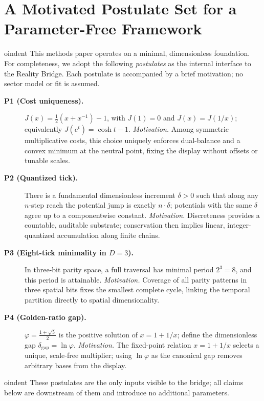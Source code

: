 \documentclass[11pt]{article}
\theoremstyle{plain}
\theoremstyle{definition}
\theoremstyle{remark}
\begin{document}
\section{A Motivated Postulate Set for a Parameter-Free Framework}

oindent
This methods paper operates on a minimal, dimensionless foundation. For completeness, we adopt the following \emph{postulates} as the internal interface to the Reality Bridge. Each postulate is accompanied by a brief motivation; no sector model or fit is assumed.

\begin{description}
  \item[\textbf{P1 (Cost uniqueness).}] \(J(x)=\tfrac12(x+x^{-1})-1\), with \(J(1)=0\) and \(J(x)=J(1/x)\); equivalently \(J(e^{t})=\cosh t-1\).
  \emph{Motivation.} Among symmetric multiplicative costs, this choice uniquely enforces dual-balance and a convex minimum at the neutral point, fixing the display without offsets or tunable scales.

  \item[\textbf{P2 (Quantized tick).}] There is a fundamental dimensionless increment \(\delta>0\) such that along any \(n\)-step reach the potential jump is exactly \(n\cdot\delta\); potentials with the same \(\delta\) agree up to a componentwise constant.
  \emph{Motivation.} Discreteness provides a countable, auditable substrate; conservation then implies linear, integer-quantized accumulation along finite chains.

  \item[\textbf{P3 (Eight-tick minimality in \(D=3\)).}] In three-bit parity space, a full traversal has minimal period \(2^{3}=8\), and this period is attainable.
  \emph{Motivation.} Coverage of all parity patterns in three spatial bits fixes the smallest complete cycle, linking the temporal partition directly to spatial dimensionality.

  \item[\textbf{P4 (Golden-ratio gap).}] \(\varphi=\tfrac{1+\sqrt5}{2}\) is the positive solution of \(x=1+1/x\); define the dimensionless gap \(\delta_{\mathrm{gap}}=\ln\varphi\).
  \emph{Motivation.} The fixed-point relation \(x=1+1/x\) selects a unique, scale-free multiplier; using \(\ln\varphi\) as the canonical gap removes arbitrary bases from the display.
\end{description}


oindent These postulates are the only inputs visible to the bridge; all claims below are downstream of them and introduce no additional parameters.
\end{document}
